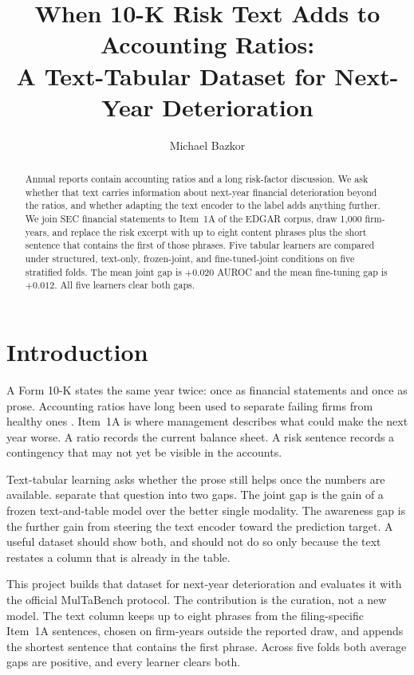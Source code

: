 \documentclass{article}
\title{When 10-K Risk Text Adds to Accounting Ratios:\\
A Text-Tabular Dataset for Next-Year Deterioration}
\author{Michael Bazkor}
\begin{document}
\maketitle

\begin{abstract}
Annual reports contain accounting ratios and a long risk-factor discussion.
We ask whether that text carries information about next-year financial deterioration beyond the ratios, and whether adapting the text encoder to the label adds anything further.
We join SEC financial statements to Item~1A of the EDGAR corpus, draw 1{,}000 firm-years, and replace the risk excerpt with up to eight content phrases plus the short sentence that contains the first of those phrases.
Five tabular learners are compared under structured, text-only, frozen-joint, and fine-tuned-joint conditions on five stratified folds.
The mean joint gap is $+0.020$ AUROC and the mean fine-tuning gap is $+0.012$.
All five learners clear both gaps.
\end{abstract}

\section{Introduction}

A Form 10-K states the same year twice: once as financial statements and once as prose.
Accounting ratios have long been used to separate failing firms from healthy ones \citep{altman1968financial}.
Item~1A is where management describes what could make the next year worse.
A ratio records the current balance sheet.
A risk sentence records a contingency that may not yet be visible in the accounts.

Text-tabular learning asks whether the prose still helps once the numbers are available.
\citet{arazi2026multabench} separate that question into two gaps.
The joint gap is the gain of a frozen text-and-table model over the better single modality.
The awareness gap is the further gain from steering the text encoder toward the prediction target.
A useful dataset should show both, and should not do so only because the text restates a column that is already in the table.

This project builds that dataset for next-year deterioration and evaluates it with the official MulTaBench protocol.
The contribution is the curation, not a new model.
The text column keeps up to eight phrases from the filing-specific Item~1A sentences, chosen on firm-years outside the reported draw, and appends the shortest sentence that contains the first phrase.
Across five folds both average gaps are positive, and every learner clears both.
\end{document}

